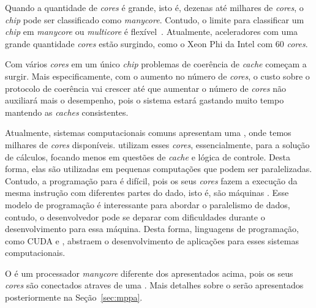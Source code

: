 Quando a quantidade de \textit{cores} é grande, isto é, dezenas até milhares de
\textit{cores}, o \textit{chip} pode ser classificado como \textit{manycore}.
Contudo, o limite para classificar um \textit{chip} em \textit{manycore} ou
\textit{multicore} é flexível~\cite{Tanenbaum2015}.
Atualmente, aceleradores com uma grande quantidade \textit{cores} estão
surgindo, como o Xeon Phi da Intel com 60 \textit{cores}.

Com vários \textit{cores} em um único \textit{chip} problemas de coerência de
\textit{cache} começam a surgir. Mais especificamente, com o aumento no número
de \textit{cores}, o custo sobre o protocolo de coerência vai crescer até que
aumentar o número de \textit{cores} não auxiliará mais o desempenho, pois o sistema
estará gastando muito tempo mantendo as \textit{caches} consistentes.


Atualmente, sistemas computacionais comuns apresentam uma \gpu, onde temos
milhares de \textit{cores} disponíveis. \gpus utilizam esses \textit{cores},
essencialmente, para a solução de cálculos, focando menos em questões de
\textit{cache} e lógica de controle. Desta forma, elas são utilizadas em
pequenas computações que podem ser paralelizadas. Contudo, a programação para
\gpus é difícil, pois os seus \textit{cores} fazem a execução da mesma instrução
com diferentes partes do dado, isto é, são máquinas \simd. Esse modelo de
programação é interessante para abordar o paralelismo de dados, contudo, o
desenvolvedor pode se deparar com dificuldades durante o desenvolvimento para
essa máquina. Desta forma, linguagens de programação, como CUDA e \opengl,
abstraem o desenvolvimento de aplicações para esses sistemas computacionais.

O \mppa é um processador \textit{manycore} diferente dos apresentados acima,
pois os seus \textit{cores} são conectados atraves de uma \noc. Mais detalhes
sobre o \mppa serão apresentados posteriormente na Seção~\ref{sec:mppa}.


